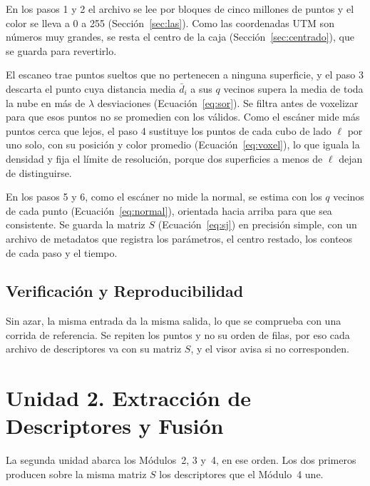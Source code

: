 En los pasos 1 y 2 el archivo se lee por bloques de cinco millones de
puntos y el color se lleva a 0 a 255 (Sección~\ref{sec:las}).
Como las coordenadas UTM son números muy grandes, se resta el
centro de la caja (Sección~\ref{sec:centrado}), que se guarda para revertirlo.

El escaneo trae puntos sueltos que no pertenecen a ninguna
superficie, y el paso 3 descarta el punto cuya distancia media $\bar d_i$ a sus $q$
vecinos supera la media de toda la nube en más de $\lambda$ desviaciones
(Ecuación~\ref{eq:sor}). Se filtra antes de voxelizar para que esos puntos no se
promedien con los válidos. Como el escáner mide más puntos cerca que
lejos, el paso 4 sustituye los puntos de cada cubo de lado $\ell$ por uno solo, con su
posición y color promedio (Ecuación~\ref{eq:voxel}), lo que iguala la densidad y fija el
límite de resolución, porque dos superficies a menos de $\ell$ dejan de distinguirse.

En los pasos 5 y 6, como el escáner no mide la normal, se estima con
los $q$ vecinos de cada punto (Ecuación~\ref{eq:normal}), orientada hacia arriba para que
sea consistente. Se guarda la matriz $S$ (Ecuación~\ref{eq:sj}) en
precisión simple, con un archivo de metadatos que registra los parámetros, el centro
restado, los conteos de cada paso y el tiempo.

\subsection{Verificación y Reproducibilidad}
\label{sec:u1-reproducibilidad}

Sin azar, la misma entrada da la misma salida, lo que se comprueba con una
corrida de referencia. Se repiten los puntos y no
su orden de filas, por eso cada archivo de descriptores va con su matriz $S$, y el
visor avisa si no corresponden.

\section{Unidad 2. Extracción de Descriptores y Fusión}
\label{sec:unidad2}

La segunda unidad abarca los Módulos~2, 3 y~4, en ese orden. Los dos primeros
producen sobre la misma matriz $S$ los descriptores que el Módulo~4 une.

